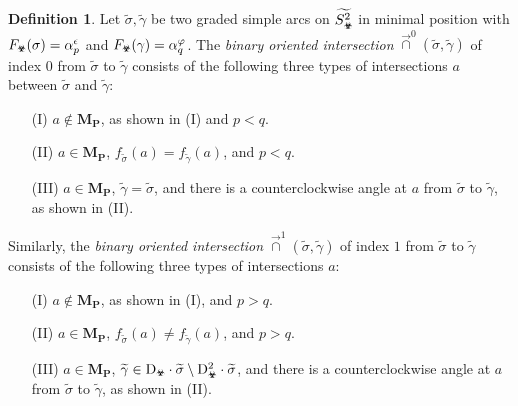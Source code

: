 \documentclass[11pt,a4paper,reqno]{amsart}%
\theoremstyle{plain}
\theoremstyle{definition}
\newtheorem{definition}[definition]{Definition}
\numberwithin{equation}{section}
\numberwithin{equation}{section}
\def\shk{F\x}
\def\x{_\vot}
\def\Dfang{\mathrm{D}^2_\vot}
\def\M{\mathbf{M}}
\renewcommand\P{\mathbf{P}} %
\def\vot{\text{\Biohazard}}
\begin{document}
\begin{definition} \label{def:boint}
Let $\widetilde{\sigma},\widetilde{\gamma}$ be two graded simple arcs on  $\widetilde{S\x^2} $ in   minimal position  with $\shk(\sigma)=\alpha_{p}^{\epsilon}$ and  $\shk(\gamma)=\alpha_{q}^{\varphi}$.
The \emph{binary oriented intersection} $\overrightarrow{\cap}^0(\widetilde{\sigma},\widetilde{\gamma})$   of index $0$  from $\widetilde{\sigma} $ to $\widetilde{\gamma}$  consists of the following three types of  intersections $a$ between $ \widetilde{\sigma}$ and $ \widetilde{\gamma}$: 
\begin{enumerate}
	\item[(I)] $a\notin \M_\P$,   as shown  in (I) and $p<q$.
	\item[(II)] $a\in \M_\P$, $ f_{\widetilde{\sigma}}(a)=f_{\widetilde{\gamma} }(a)$,  
    and $p<q$.
	\item[(III)]  $a\in \M_\P$, $\widetilde{\gamma}=\widetilde{\sigma}$, and  there is a  counterclockwise angle at $a$   from $\widetilde{\sigma}$ to $\widetilde{\gamma}$,  as shown in   (II).
	\end{enumerate}
 

    
    Similarly,  the \emph{binary oriented intersection} $\overrightarrow{\cap}^1(\widetilde{\sigma},\widetilde{\gamma})$   of index $1$  from $\widetilde{\sigma}$ to $\widetilde{\gamma}$  consists of the following three types of   intersections $a $: 
\begin{enumerate}
	\item[(I)] $a\notin \M_\P$,  as shown in  (I), and $p>q$.
	\item[(II)] $a\in \M_\P$, $ f_{\widetilde{\sigma}}(a)\ne f_{\widetilde{\gamma} }(a)$, 
    and $p>q$.
	\item[(III)]  $a\in \M_\P$, $\widetilde{\gamma}\in \mathrm{D}_{\vot}\cdot \widetilde{\sigma}\setminus\Dfang \cdot\widetilde{\sigma}$, and  there is a  counterclockwise angle at $a$   from $\widetilde{\sigma}$ to $\widetilde{\gamma}$, as shown in (II).
	\end{enumerate} 
\end{definition}
\end{document}
